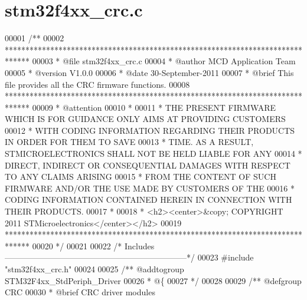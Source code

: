 \section{stm32f4xx\+\_\+crc.\+c}
\label{stm32f4xx__crc_8c_source}

\begin{DoxyCode}
00001 \textcolor{comment}{/**}
00002 \textcolor{comment}{  ******************************************************************************}
00003 \textcolor{comment}{  * @file    stm32f4xx\_crc.c}
00004 \textcolor{comment}{  * @author  MCD Application Team}
00005 \textcolor{comment}{  * @version V1.0.0}
00006 \textcolor{comment}{  * @date    30-September-2011}
00007 \textcolor{comment}{  * @brief   This file provides all the CRC firmware functions.}
00008 \textcolor{comment}{  ******************************************************************************}
00009 \textcolor{comment}{  * @attention}
00010 \textcolor{comment}{  *}
00011 \textcolor{comment}{  * THE PRESENT FIRMWARE WHICH IS FOR GUIDANCE ONLY AIMS AT PROVIDING CUSTOMERS}
00012 \textcolor{comment}{  * WITH CODING INFORMATION REGARDING THEIR PRODUCTS IN ORDER FOR THEM TO SAVE}
00013 \textcolor{comment}{  * TIME. AS A RESULT, STMICROELECTRONICS SHALL NOT BE HELD LIABLE FOR ANY}
00014 \textcolor{comment}{  * DIRECT, INDIRECT OR CONSEQUENTIAL DAMAGES WITH RESPECT TO ANY CLAIMS ARISING}
00015 \textcolor{comment}{  * FROM THE CONTENT OF SUCH FIRMWARE AND/OR THE USE MADE BY CUSTOMERS OF THE}
00016 \textcolor{comment}{  * CODING INFORMATION CONTAINED HEREIN IN CONNECTION WITH THEIR PRODUCTS.}
00017 \textcolor{comment}{  *}
00018 \textcolor{comment}{  * <h2><center>&copy; COPYRIGHT 2011 STMicroelectronics</center></h2>}
00019 \textcolor{comment}{  ******************************************************************************}
00020 \textcolor{comment}{  */}
00021 
00022 \textcolor{comment}{/* Includes ------------------------------------------------------------------*/}
00023 \textcolor{preprocessor}{#}\textcolor{preprocessor}{include} "stm32f4xx_crc.h"
00024 
00025 \textcolor{comment}{/** @addtogroup STM32F4xx\_StdPeriph\_Driver}
00026 \textcolor{comment}{  * @\{}
00027 \textcolor{comment}{  */}
00028 
00029 \textcolor{comment}{/** @defgroup CRC }
00030 \textcolor{comment}{  * @brief CRC driver modules}

\end{DoxyCode}
